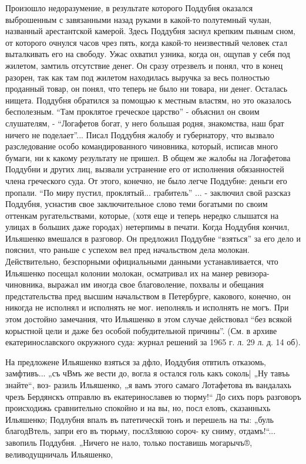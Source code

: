 Произошло недоразумение, в результате которого Поддубня оказался выброшенным с
завязанными назад руками в какой-то полутемный чулан, названный арестантской
камерой.  Здесь Поддубня заснул крепким пьяным сном, от которого очнулся часов
чрез пять, когда какой-то неизвестный человек стал выталкивать его на свободу.
Ужас охватил узника, когда он, ощупав у себя под жилетом, замтиль отсутствие
денег. Он сразу отрезвелъ и понял, что в конец разорен, так как там под жилетом
находилась выручка за весь полностью проданный товар, он понял, что теперь не
было ни товара, ни денег. Осталась нищета. Поддубня обратился за помощью к
местным властям, но это оказалось бесполезным. ``Там проклятое греческое
царство'' - объяснил он своим слушателям, - ``Логафетов богат, у него большая
родня, знакомства, наш брат ничего не поделает''...  Писал Поддубня жалобу и
губернатору, что вызвало разследование особо командированного чиновника,
который, исписав много бумаги, ни к какому результату не пришел. В общем же
жалобы на Логафетова Поддубни и других лиц, вызвали
устранение его от исполнения обязанностей члена греческого суда. От этого,
конечно, не было легче Поддубне: деньги его пропали. ``По миру пустил,
проклятый... грабитель'' ... - заключил свой разсказ Поддубня, уснастив свое
заключительное слово теми богатыми по своим оттенкам ругательствами, которые,
(хотя еще и теперь нередко слышатся на улицах в больших даже городах) нетерпимы
в печати.  Когда Ноддубня кончил, Ильяшенко вмешался в разговор. Он предложил
Поддубне ``взяться'' за его дело и пояснил, что раньше с успехом вел пред
начальством дела молокан.  Действительно, безспорными официальными данными
устанавливается, что Ильяшенко посещал колонии молокан, осматривал их на манер
ревизора-чиновника, выражал им иногда свое благоволение, похвалы и обещания
предстательства пред высшим начальством в Петербурге, какового, конечно, он
никогда не исполнял и исполнять не мог.  иеполняль и исполнять не могъ.  При
этом достойно замечания, что Ильяшенко в этом случае действовал ``без всякой
корыстной цели и даже без особой побудительной причины''. (См. в архиве
екатеринославского окружного суда: журнал решений за 1965 г. л. 29 л. д. 14
об).

На предложене Ильяшенко взяться за дфло, Иоддубия
отвтилъ отказомь, замфтивъ... „съ чВмъ же вести до,
вогла я остался голь какъ соколь| „Ну тавъь знайте“, воз-
разиль Ильяшенко, „я вамъ этого самаго Лотафетова въ
вандалахь чрезъ Бердянскъ отправлю въ екатеринославев ю
тюрму!“ До сихъ поръ разговоръ происходижь сравнительно
спокойно и на вы, но, посл еловъ, сказанныхь Ильяшенко;
Подлубня впалъ въ патетическй тонъ и перешель на ты:
„буль благодВтель, запри его въ тюрьму, послЗляюю сороч-
ку сниму, отдамъ!“... завопиль Поддубня. „Ничего не нало,
только поставишь могарычъ®, веливодущничаль Ильяшенко,

